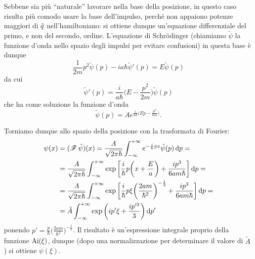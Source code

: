 Sebbene sia più ``naturale'' lavorare nella base della posizione, in questo caso risulta più comodo usare la base dell'impulso, perch\'e non appaiono potenze maggiori di $\hat{q}$ nell'hamiltoniano: si ottiene dunque un'equazione differenziale del primo, e non del secondo, ordine.
L'equazione di Schr\"odinger (chiamiamo $\tilde{\psi}$ la funzione d'onda nello spazio degli impulsi per evitare confusioni) in questa base è dunque
\begin{equation}
	\frac1{2m}p^2\tilde{\psi}(p)-ia\hbar\tilde{\psi}'(p)=E\tilde{\psi}(p)
	\label{eq:schrodinger-impulso-potenziale-lineare}
\end{equation}
da cui
\begin{equation}
	\tilde{\psi}'(p)=\frac{i}{a\hbar}\bigg(E-\frac{p^2}{2m}\bigg)\tilde{\psi}(p)
\end{equation}
che ha come soluzione la funzione d'onda
\begin{equation}
	\tilde{\psi}(p)=Ae^{\frac{i}{a\hbar}\big(Ep-\frac{p^3}{6m}\big)}.
\end{equation}

Torniamo dunque allo spazio della posizione con la trasformata di Fourier:
\begin{equation}
	\begin{split}
		\psi(x)&=(\operatorname{\mathscr{F}}{\tilde{\psi}})(x)=\frac{A}{\sqrt{2\pi\hbar}}\int_{-\infty}^{+\infty}e^{-\frac{i}{\hbar}px}\tilde{\psi}(p)\,\textup{d} p=\\
		&=\frac{A}{\sqrt{2\pi\hbar}}\int_{-\infty}^{+\infty}\exp\bigg[\frac{i}{\hbar}p\bigg(x+\frac{E}{a}\bigg)+\frac{ip^3}{6am\hbar}\bigg]\,\textup{d} p=\\
		&=\frac{A}{\sqrt{2\pi\hbar}}\int_{-\infty}^{+\infty}\exp\bigg[\frac{i}{\hbar}p\xi\bigg(\frac{2am}{\hbar^2}\bigg)^{-\frac13}+\frac{ip^3}{6am\hbar}\bigg]\,\textup{d} p=\\ &=\tilde{A}\int_{-\infty}^{+\infty}\exp\bigg(ip'\xi+\frac{ip'^3}3\bigg)\,\textup{d} p'
	\end{split}
\end{equation}
ponendo $p'=\frac{p}{\hbar}\big(\frac{2am}{\hbar^2}\big)^{-\frac13}$.
Il risultato è un'espressione integrale proprio della funzione $\operatorname{Ai}(\xi)$, dunque (dopo una normalizzazione per determinare il valore di $\tilde{A}$) si ottiene $\psi(\xi)$.

